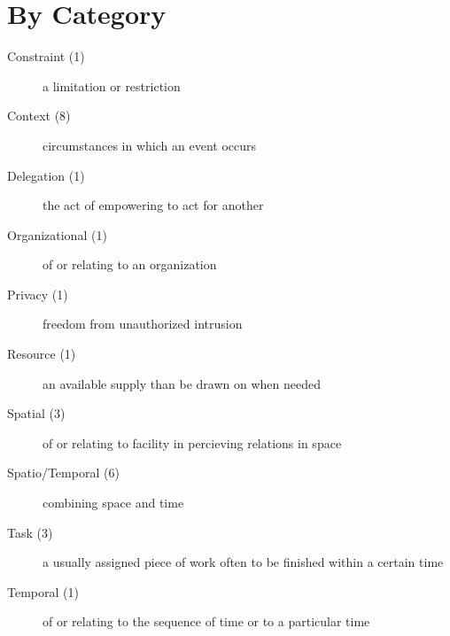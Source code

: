 \documentclass[letterpaper,10pt,english]{sphinxmanual}
\begin{document}
\section{By Category}
\label{research_questions/RQ_3:by-category}\begin{description}
\item[{Constraint (1)}] \leavevmode
a limitation or restriction

\item[{Context (8)}] \leavevmode
circumstances in which an event occurs

\item[{Delegation (1)}] \leavevmode
the act of empowering to act for another

\item[{Organizational (1)}] \leavevmode
of or relating to an organization

\item[{Privacy (1)}] \leavevmode
freedom from unauthorized intrusion

\item[{Resource (1)}] \leavevmode
an available supply than be drawn on when needed

\item[{Spatial (3)}] \leavevmode
of or relating to facility in percieving relations in space

\item[{Spatio/Temporal (6)}] \leavevmode
combining space and time

\item[{Task (3)}] \leavevmode
a usually assigned piece of work often to be finished within a certain time

\item[{Temporal (1)}] \leavevmode
of or relating to the sequence of time or to a particular time

\end{description}

{\hfill{}\hfill}
\end{document}
